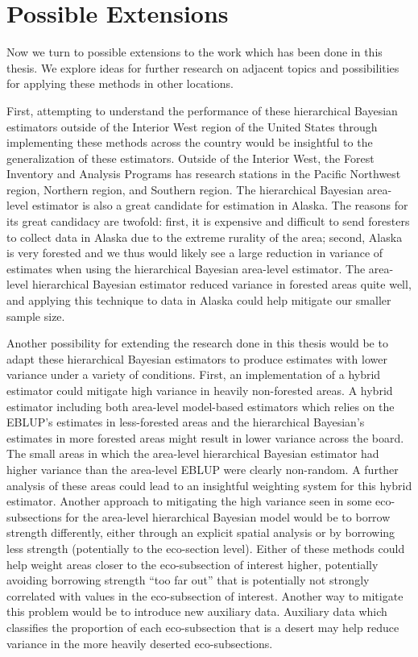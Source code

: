 \documentclass[12pt,twoside]{reedthesis}
\begin{document}
\hypertarget{possible-extensions}{%
\section{Possible Extensions}\label{possible-extensions}}

Now we turn to possible extensions to the work which has been done in this thesis. We explore ideas for further research on adjacent topics and possibilities for applying these methods in other locations.

First, attempting to understand the performance of these hierarchical Bayesian estimators outside of the Interior West region of the United States through implementing these methods across the country would be insightful to the generalization of these estimators. Outside of the Interior West, the Forest Inventory and Analysis Programs has research stations in the Pacific Northwest region, Northern region, and Southern region. The hierarchical Bayesian area-level estimator is also a great candidate for estimation in Alaska. The reasons for its great candidacy are twofold: first, it is expensive and difficult to send foresters to collect data in Alaska due to the extreme rurality of the area; second, Alaska is very forested and we thus would likely see a large reduction in variance of estimates when using the hierarchical Bayesian area-level estimator. The area-level hierarchical Bayesian estimator reduced variance in forested areas quite well, and applying this technique to data in Alaska could help mitigate our smaller sample size.

Another possibility for extending the research done in this thesis would be to adapt these hierarchical Bayesian estimators to produce estimates with lower variance under a variety of conditions. First, an implementation of a hybrid estimator could mitigate high variance in heavily non-forested areas. A hybrid estimator including both area-level model-based estimators which relies on the EBLUP's estimates in less-forested areas and the hierarchical Bayesian's estimates in more forested areas might result in lower variance across the board. The small areas in which the area-level hierarchical Bayesian estimator had higher variance than the area-level EBLUP were clearly non-random. A further analysis of these areas could lead to an insightful weighting system for this hybrid estimator. Another approach to mitigating the high variance seen in some eco-subsections for the area-level hierarchical Bayesian model would be to borrow strength differently, either through an explicit spatial analysis or by borrowing less strength (potentially to the eco-section level). Either of these methods could help weight areas closer to the eco-subsection of interest higher, potentially avoiding borrowing strength ``too far out'' that is potentially not strongly correlated with values in the eco-subsection of interest. Another way to mitigate this problem would be to introduce new auxiliary data. Auxiliary data which classifies the proportion of each eco-subsection that is a desert may help reduce variance in the more heavily deserted eco-subsections.
\end{document}
